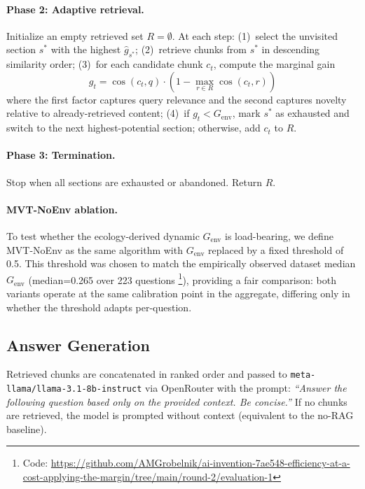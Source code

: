 \documentclass[11pt,letterpaper]{article}
\begin{document}
\paragraph{Phase 2: Adaptive retrieval.} Initialize an empty retrieved set $R = \emptyset$. At each step:
(1)~select the unvisited section $s^*$ with the highest $\hat{g}_{s^*}$;
(2)~retrieve chunks from $s^*$ in descending similarity order;
(3)~for each candidate chunk $c_t$, compute the marginal gain
\begin{equation}
  g_t = \cos(c_t, q) \cdot \left(1 - \max_{r \in R} \cos(c_t, r)\right)
\end{equation}
where the first factor captures query relevance and the second captures novelty relative to already-retrieved content;
(4)~if $g_t < G_{\mathrm{env}}$, mark $s^*$ as exhausted and switch to the next highest-potential section; otherwise,
add $c_t$ to $R$.

\paragraph{Phase 3: Termination.} Stop when all sections are exhausted or abandoned. Return $R$.

\paragraph{MVT-NoEnv ablation.} To test whether the ecology-derived dynamic $G_{\mathrm{env}}$ is load-bearing, we
define MVT-NoEnv as the same algorithm with $G_{\mathrm{env}}$ replaced by a fixed threshold of 0.5. This threshold was
chosen to match the empirically observed dataset median $G_{\mathrm{env}}$ (median=0.265 over 223 questions%
\footnote{Code: \url{https://github.com/AMGrobelnik/ai-invention-7ae548-efficiency-at-a-cost-applying-the-margin/tree/main/round-2/evaluation-1}}),
providing a fair comparison: both variants operate at the same calibration point in the aggregate, differing only in
whether the threshold adapts per-question.

\subsection{Answer Generation}

Retrieved chunks are concatenated in ranked order and passed to \texttt{meta-llama/llama-3.1-8b-instruct} via OpenRouter
with the prompt: \emph{``Answer the following question based only on the provided context. Be concise.''} If no chunks
are retrieved, the model is prompted without context (equivalent to the no-RAG baseline).
\end{document}
